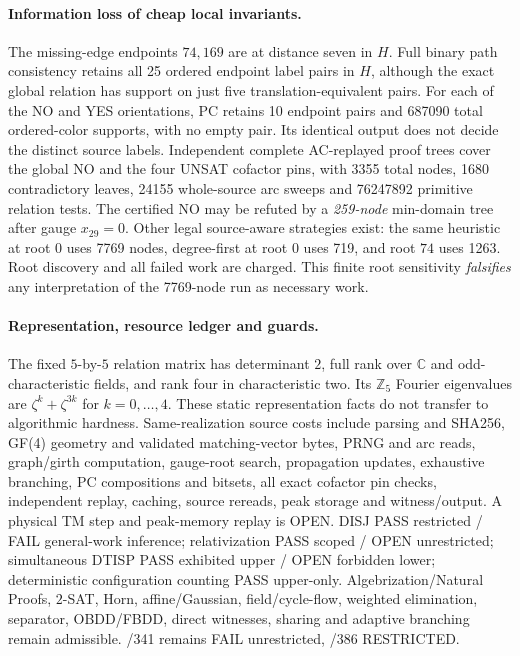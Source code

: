 \documentclass[11pt]{article}
\begin{document}
\paragraph{Information loss of cheap local invariants.}
The missing-edge endpoints $74,169$ are at distance seven in $H$.
Full binary path consistency retains all 25 ordered endpoint
label pairs in $H$, although the exact global relation has support
on just five translation-equivalent pairs.
For each of the NO and YES orientations, PC retains 10 endpoint
pairs and 687090 total ordered-color supports, with no empty pair.
Its identical output does not decide the distinct source labels.
Independent complete AC-replayed proof trees cover the global NO
and the four UNSAT cofactor pins, with 3355 total nodes, 1680
contradictory leaves, 24155 whole-source arc sweeps and
76247892 primitive relation tests. The certified NO may be
refuted by a \emph{259-node} min-domain tree after gauge $x_{29}=0$.
Other legal source-aware strategies exist: the same heuristic
at root $0$ uses 7769 nodes, degree-first at root $0$ uses 719,
and root $74$ uses 1263. Root discovery and all failed work are
charged. This finite root sensitivity \emph{falsifies} any
interpretation of the 7769-node run as necessary work.

\paragraph{Representation, resource ledger and guards.}
The fixed $5$-by-$5$ relation matrix has determinant $2$, full
rank over $\mathbb C$ and odd-characteristic fields, and rank
four in characteristic two. Its
$\mathbb Z_5$ Fourier eigenvalues are
$\zeta^k+\zeta^{3k}$ for $k=0,\ldots,4$.
These static representation facts do not transfer to algorithmic
hardness. Same-realization source costs include parsing and
SHA256, GF(4) geometry and validated matching-vector bytes,
PRNG and arc reads, graph/girth computation, gauge-root
search, propagation updates, exhaustive branching,
PC compositions and bitsets, all exact cofactor pin checks,
independent replay, caching, source rereads, peak storage and
witness/output. A physical TM step and peak-memory replay is
OPEN. DISJ PASS restricted / FAIL general-work inference;
relativization PASS scoped / OPEN unrestricted; simultaneous
DTISP PASS exhibited upper / OPEN forbidden lower;
deterministic configuration counting PASS upper-only.
Algebrization/Natural Proofs, $2$-SAT, Horn, affine/Gaussian,
field/cycle-flow, weighted elimination, separator, OBDD/FBDD,
direct witnesses, sharing and adaptive branching remain
admissible. /341 remains FAIL unrestricted, /386 RESTRICTED.
\end{document}
